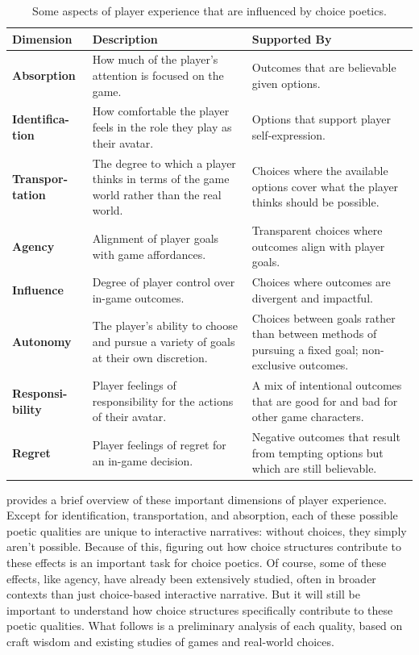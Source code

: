 \begin{table}[!p]
\begingroup
\renewcommand*{\arraystretch}{1.5}
\begin{tabular}{p{5.5em}p{14em}p{13.5em}}
\textbf{Dimension} & \textbf{Description} & \textbf{Supported By} \\
\hline
\textbf{Absorption} & How much of the player's attention is focused on the game. & Outcomes that are believable given options. \\
\textbf{Identifica-tion} & How comfortable the player feels in the role they play as their avatar. & Options that support player self-expression. \\
\textbf{Transpor-tation} & The degree to which a player thinks in terms of the game world rather than the real world. & Choices where the available options cover what the player thinks should be possible. \\
\textbf{Agency} & Alignment of player goals with game affordances. & Transparent choices where outcomes align with player goals.\\
\textbf{Influence} & Degree of player control over in-game outcomes. & Choices where outcomes are divergent and impactful. \\
\textbf{Autonomy} & The player's ability to choose and pursue a variety of goals at their own discretion. & Choices between goals rather than between methods of pursuing a fixed goal; non-exclusive outcomes. \\
\textbf{Responsi-bility} & Player feelings of responsibility for the actions of their avatar. & A mix of intentional outcomes that are good for and bad for other game characters. \\
\textbf{Regret} & Player feelings of regret for an in-game decision. & Negative outcomes that result from tempting options but which are still believable. \\
\end{tabular}
\endgroup
\caption[Dimensions of player experience]{Some aspects of player experience that are influenced by choice poetics.}
\label{tab:dimensions-of-experience}
\end{table}

 provides a brief overview of these important dimensions of player experience.
%
Except for identification, transportation, and absorption, each of these possible poetic qualities are unique to interactive narratives: without choices, they simply aren't possible.
%
Because of this, figuring out how choice structures contribute to these effects 
is an important task for choice poetics.
%
Of course, some of these effects, like agency, have already been extensively studied, often in broader contexts than just choice-based interactive narrative.
%
But it will still be important to understand how choice structures specifically contribute to these poetic qualities.
%
What follows is a preliminary analysis of each quality, based on craft wisdom and existing studies of games and real-world choices.

